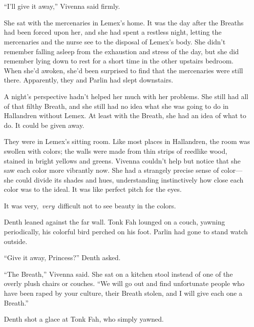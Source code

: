 \chapter{}

“I’ll give it away,” Vivenna said firmly.

She sat with the mercenaries in Lemex’s home. It was the day after the Breaths had been forced upon her, and she had spent a restless night, letting the mercenaries and the nurse see to the disposal of Lemex’s body. She didn’t remember falling asleep from the exhaustion and stress of the day, but she did remember lying down to rest for a short time in the other upstairs bedroom. When she’d awoken, she’d been surprised to find that the mercenaries were still there. Apparently, they and Parlin had slept downstairs.

A night’s perspective hadn’t helped her much with her problems. She still had all of that filthy Breath, and she still had no idea what she was going to do in Hallandren without Lemex. At least with the Breath, she had an idea of what to do. It could be given away.

They were in Lemex’s sitting room. Like most places in Hallandren, the room was swollen with colors; the walls were made from thin strips of reedlike wood, stained in bright yellows and greens. Vivenna couldn’t help but notice that she saw each color more vibrantly now. She had a strangely precise sense of color—she could divide its shades and hues, understanding instinctively how close each color was to the ideal. It was like perfect pitch for the eyes.

It was very,~\textit{very}~difficult not to see beauty in the colors.

Denth leaned against the far wall. Tonk Fah lounged on a couch, yawning periodically, his colorful bird perched on his foot. Parlin had gone to stand watch outside.

“Give it away, Princess?” Denth asked.

“The Breath,” Vivenna said. She sat on a kitchen stool instead of one of the overly plush chairs or couches. “We will go out and find unfortunate people who have been raped by your culture, their Breath stolen, and I will give each one a Breath.”

Denth shot a glace at Tonk Fah, who simply yawned.

